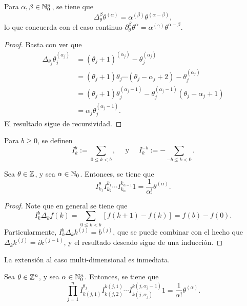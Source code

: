 \begin{proposition}
	Para $\alpha,\beta\in\mathbb{N}_0^n$, se tiene que 
	\begin{equation*}
		\Delta^\beta_\theta \theta^{(\alpha)} = \alpha^{(\beta)}\theta^{(\alpha-\beta)},
	\end{equation*}
	lo que concuerda con el caso continuo $\partial^\beta_\theta \theta^\alpha = \alpha^{(\gamma)}\theta^{\alpha-\beta}$.
\end{proposition}
\begin{proof}
	Basta con ver que 
	\begin{align*}
		\Delta_{\theta_j} \theta_j^{(\alpha_j)} &= (\theta_j+1)^{(\alpha_j)} - \theta_j^{(\alpha_j)} \\
		& = (\theta_j+1)\theta_j \cdots(\theta_j - \alpha_j+2) - \theta_j^{(\alpha_j)} \\
		& = (\theta_j+1)\theta_j^{(\alpha_j-1)} - \theta_j^{(\alpha_j-1)}(\theta_j - \alpha_j + 1) \\
		& = \alpha_j \theta_j^{(\alpha_j-1)}.
	\end{align*}
	El resultado sigue de recursividad.
\end{proof}
\begin{definition}
	Para $b\geq0$, se definen
	\begin{equation*}
		I^b_k := \sum_{0\leq k<b}, \quad \text{ y } \quad I^{-b}_k := -\sum_{-b\leq k < 0}.
	\end{equation*}
\end{definition}
\begin{theorem}
	Sea $\theta\in\mathbb{Z}$, y sea $\alpha\in\mathbb{N}_0$. Entonces, se tiene que
	\begin{equation*}
		I^\theta_{k_1}I^{k_1}_{k_2} \cdots I^{k_{\alpha-1}}_{k_\alpha} 1 = \frac{1}{\alpha!} \theta^{(\alpha)}.
	\end{equation*}
\end{theorem}
\begin{proof}
	Note que en general se tiene que
	\begin{equation*}
		I^b_k\Delta_k f(k) = \sum_{0\leq k<b} [f(k+1)- f(k)] = f(b) - f(0).
	\end{equation*}
	Particularmente, $I^b_k\Delta_k k^{(j)} = b^{(j)}$, que se puede combinar con el hecho que $\Delta_kk^{(j)}=ik^{(j-1)}$, y el resultado deseado sigue de una inducción.
\end{proof}
La extensión al caso multi-dimensional es inmediata. 
\begin{corollary}
	Sea $\theta\in\mathbb{Z}^n$, y sea $\alpha\in\mathbb{N}_0^n$. Entonces, se tiene que
	\begin{equation*}
		\prod_{j=1}^n I^{\theta_j}_{k(j, 1)} I^{k(j, 1)}_{k(j, 2)} \cdots I^{k(j, \alpha_j-1)}_{k(j, \alpha_j)} 1 = \frac{1}{\alpha!}\theta^{(\alpha)}.
	\end{equation*}
\end{corollary}
